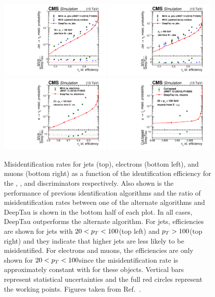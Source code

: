 \begin{figure}
  \centering
  \includegraphics[width=0.49\textwidth]{Figures/Detector/CMS/tau_id_jet_misid_wjet_20_100.pdf}
  \includegraphics[width=0.49\textwidth]{Figures/Detector/CMS/tau_id_jet_misid_wjet_gt100.pdf}
  \includegraphics[width=0.49\textwidth]{Figures/Detector/CMS/tau_id_e_misid_20_100.pdf}
  \includegraphics[width=0.49\textwidth]{Figures/Detector/CMS/tau_id_mu_misid_20_100.pdf}
  \caption[Performance of the DeepTau ID Algorithm]{Misidentification rates for jets (top), electrons (bottom left), and muons (bottom right) as a function of the \tauh identification efficiency for the \Djet, \De, and \Dm discriminators respectively. Also shown is the performance of previous \tauh identification algorithms and the ratio of misidentification rates between one of the alternate algorithms and DeepTau is shown in the bottom half of each plot. In all cases, DeepTau outperforms the alternate algorithm. For jets, efficiencies are shown for jets with $20 < p_T < 100$\GeV (top left) and $p_T>100$\GeV (top right) and they indicate that higher \pt jets are less likely to be misidentified. For electrons and muons, the efficiencies are only shown for $20 < p_T < 100$\GeV since the misidentification rate is approximately constant with \pt for these objects. Vertical bars represent statistical uncertainties and the full red circles represent the working points. Figures taken from Ref.~\cite{CMS:2022prd}.}\label{tab:deeptau_misid_rates}

\end{figure}
